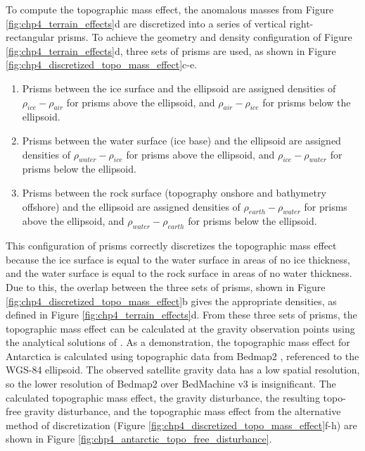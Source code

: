 To compute the topographic mass effect, the anomalous masses from Figure \ref{fig:chp4_terrain_effects}d are discretized into a series of vertical right-rectangular prisms. To achieve the geometry and density configuration of Figure \ref{fig:chp4_terrain_effects}d, three sets of prisms are used, as shown in Figure \ref{fig:chp4_discretized_topo_mass_effect}c-e. 

\begin{enumerate}
    \item Prisms between the ice surface and the ellipsoid are assigned densities of $\rho_{ice} - \rho_{air}$ for prisms above the ellipsoid, and $\rho_{air} - \rho_{ice}$ for prisms below the ellipsoid. 
    \item Prisms between the water surface (ice base) and the ellipsoid are assigned densities of $\rho_{water} - \rho_{ice}$ for prisms above the ellipsoid, and $\rho_{ice} - \rho_{water}$ for prisms below the ellipsoid. 
    \item Prisms between the rock surface (topography onshore and bathymetry offshore) and the ellipsoid are assigned densities of $\rho_{earth} - \rho_{water}$ for prisms above the ellipsoid, and $\rho_{water} - \rho_{earth}$ for prisms below the ellipsoid. 
\end{enumerate}

This configuration of prisms correctly discretizes the topographic mass effect because the ice surface is equal to the water surface in areas of no ice thickness, and the water surface is equal to the rock surface in areas of no water thickness. Due to this, the overlap between the three sets of prisms, shown in Figure \ref{fig:chp4_discretized_topo_mass_effect}b gives the appropriate densities, as defined in Figure \ref{fig:chp4_terrain_effects}d. From these three sets of prisms, the topographic mass effect can be calculated at the gravity observation points using the analytical solutions of \citet{nagygravitational2000}. As a demonstration, the topographic mass effect for Antarctica is calculated using topographic data from Bedmap2 \citep{fretwellbedmap22013}, referenced to the WGS-84 ellipsoid. The observed satellite gravity data has a low spatial resolution, so the lower resolution of Bedmap2 over BedMachine v3 is insignificant. The calculated topographic mass effect, the gravity disturbance, the resulting topo-free gravity disturbance, and the topographic mass effect from the alternative method of discretization (Figure \ref{fig:chp4_discretized_topo_mass_effect}f-h) are shown in Figure \ref{fig:chp4_antarctic_topo_free_disturbance}.\\

